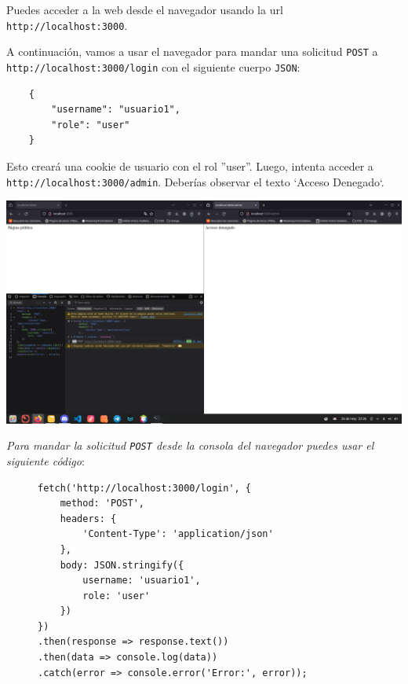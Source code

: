 Puedes acceder a la web desde el navegador usando la url \\ \texttt{http://localhost:3000}.

\newpage

A continuación, vamos a usar el navegador para mandar una solicitud \texttt{POST} a \texttt{http://localhost:3000/login} con el siguiente cuerpo \texttt{JSON}:

\begin{verbatim}
    {
        "username": "usuario1",
        "role": "user"
    }
\end{verbatim}

Esto creará una cookie de usuario con el rol ''user''. Luego, intenta acceder a \texttt{http://localhost:3000/admin}. Deberías observar el texto `Acceso Denegado`.

\begin{center}
    \includegraphics[scale=0.18]{imagenes/Captura desde 2024-05-26 23-26-34.png}
\end{center}

\textit{Para mandar la solicitud \texttt{POST} desde la consola del navegador puedes usar el siguiente código}:

\begin{figure}[h]
\begin{lstlisting}[style=Js, label={lst:fetch-post}]
fetch('http://localhost:3000/login', {
    method: 'POST',
    headers: {
        'Content-Type': 'application/json'
    },
    body: JSON.stringify({
        username: 'usuario1',
        role: 'user'
    })
})
.then(response => response.text())
.then(data => console.log(data))
.catch(error => console.error('Error:', error));
\end{lstlisting}
\end{figure}

\newpage

